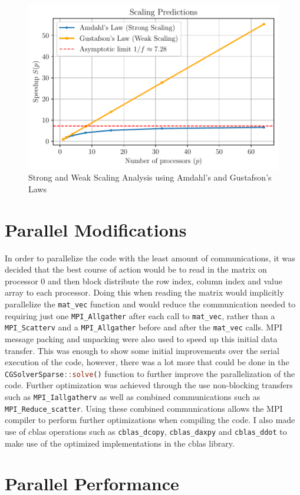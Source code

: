 \begin{figure}[h!]
    \centering
    \includegraphics[width=\textwidth]{plots/scaling_laws.pdf}
    \caption{Strong and Weak Scaling Analysis using Amdahl's and Gustafson's Laws}
    \label{fig:AmdahlPlot}
\end{figure}
\FloatBarrier

\section{Parallel Modifications}
In order to parallelize the code with the least amount of communications, it was decided that the best course of action
would be to read in the matrix on processor 0 and then block distribute the row index, column index and value array to
each processor. Doing this when reading the matrix would implicitly parallelize the \lstinline[language=Julia]|mat_vec|
function and would reduce the communication needed to requiring just one \lstinline[language=Julia]|MPI_Allgather| after
each call to \lstinline[language=Julia]|mat_vec|, rather than a \lstinline[language=Julia]|MPI_Scatterv| and a
\lstinline[language=Julia]|MPI_Allgather| before and after the \lstinline[language=Julia]|mat_vec| calls. MPI message
packing and unpacking were also used to speed up this initial data transfer. This was enough to show some initial
improvements over the serial execution of the code, however, there was a lot more that could be done in the
\lstinline[language=Julia]|CGSolverSparse::solve()| function to further improve the parallelization of the code. Further
optimization was achieved through the use non-blocking transfers such as \lstinline[language=Julia]|MPI_Iallgatherv| as
well as combined communications such as \lstinline[language=Julia]|MPI_Reduce_scatter|. Using these combined
communications allows the MPI compiler to perform further optimizations when compiling the code. I also made use of
cblas operations such as \lstinline[language=Julia]|cblas_dcopy|, \lstinline[language=Julia]|cblas_daxpy| and
\lstinline[language=Julia]|cblas_ddot| to make use of the optimized implementations in the cblas library.

\section{Parallel Performance}